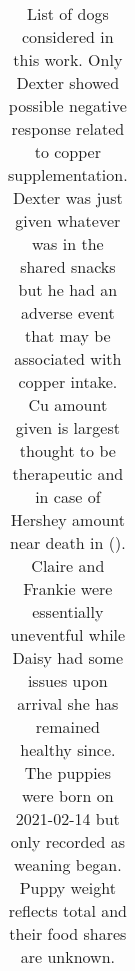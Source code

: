 {\begin{table}[H]
\begin{tabular}{|l|r|l|r|r|r|r|}
\hline
\hline
\end{tabular}
\caption{List of dogs considered in this work. Only
Dexter  showed  possible negative response related to copper supplementation.
Dexter was just given whatever was in the shared snacks but
he had an adverse event that may be associated with copper intake. 
Cu amount given is largest thought to be therapeutic and in case
of Hershey amount near death in (). Claire and Frankie were essentially uneventful while Daisy had some issues upon arrival she has remained healthy since. 
 The puppies were born on 2021-02-14 but only recorded as weaning began. 
Puppy weight reflects total and their  food shares are unknown. }
\label{tab:dogs}
\end{table}

} %
\newcommand{\mjmhersheytable}
{
\begin{table}[H] \centering
\begin{tabular}{|c|r|p{4in}|}
\hline
Date & Day number & Comment   \\
\hline
2017-09-25 & &developed skin problem, vet prescribed clavamox and miconazole chlorhexidine shampoo Malaseb   \\
2017-10-13 & & blotches mostly gone yesterday  Barb still notes some  \\
2017-11-01 & &stumbled down steps did not come up until after PMSNACK restart lipoicacid   \\
2017-11-13 & &struggles up deck steps but finally made it \\
2017-12-12 & 17512 & seems to be coughing a lot \\
2018-03-06 & 17596 & seems to cough less, continue copper \\
2018-04-19 & 17640 & came up steps on own again cadence sounded good \\
2018-04-20 & & fur seems thicker except for small area on back behind neck. Still coughing though \\
2018-04-28 & 17649 &appears alert more flexible and good up steps while still planning although he did stumble the other day  \\
2018-04-29 & 17650 & seems ok on steps, hair filling in.  \\
2018-05-29 & 17680 & not coughing much and energetic but refused to eat and diarrhea. Ate small amount indicated around 830AM. He seems ok at noon not coughing much but subdued.    \\
2018-07-02 & 17714 &lighter and not coughing except when really agitated. Made it up steps good. Could be just weight although not that much lost, something in yard wiped out with spraying, or something like potassium chlorde or the lysine making him worse  \\

\end{tabular}
\end{table}}

